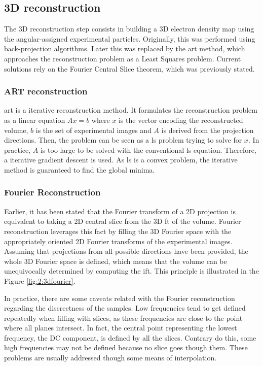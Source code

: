 \documentclass[../main.tex]{subfiles}
\begin{document}
\subsection{3D reconstruction}
The 3D reconstruction step consists in building a 3D electron density map using the angular-assigned experimental particles. Originally, this was performed using back-projection algorithms. Later this was replaced by the \gls{art} method, which approaches the reconstruction problem as a Least Squares problem. Current solutions rely on the Fourier Central Slice theorem, which was previously stated.

\subsubsection{ART reconstruction}
\Gls{art} is a iterative reconstruction method. It formulates the reconstruction problem as a linear equation $Ax = b$ where $x$ is the vector encoding the reconstructed volume, $b$ is the set of experimental images and $A$ is derived from the projection directions. Then, the problem can be seen as a \gls{ls} problem\cite{kak2001} trying to solve for $x$. In practice, $A$ is too large to be solved with the conventional \gls{ls} equation. Therefore, a iterative gradient descent is used. As \gls{ls} is a convex problem, the iterative method is guaranteed to find the global minima\cite{nikazad2008}\cite{sorzano2017b}.

\subsubsection{Fourier Reconstruction}
Earlier, it has been stated that the Fourier transform of a 2D projection is equivalent to taking a 2D central slice from the 3D \gls{ft} of the volume. Fourier reconstruction leverages this fact by filling the 3D Fourier space with the appropriately oriented 2D Fourier transforms of the experimental images. Assuming that projections from all possible directions have been provided, the whole 3D Fourier space is defined, which means that the volume can be unequivocally determined by computing the \gls{ift}. This principle is illustrated in the Figure \ref{fig:2:3dfourier}\cite{sorzano2017b}.

In practice, there are some caveats related with the Fourier reconstruction regarding the discreetness of the samples. Low frequencies tend to get defined repeatedly when filling with slices, as these frequencies are close to the point where all planes intersect. In fact, the central point representing the lowest frequency, the DC component, is defined by all the slices. Contrary do this, some high frequencies may not be defined because no slice goes though them. These problems are usually addressed though some means of interpolation.
\end{document}
